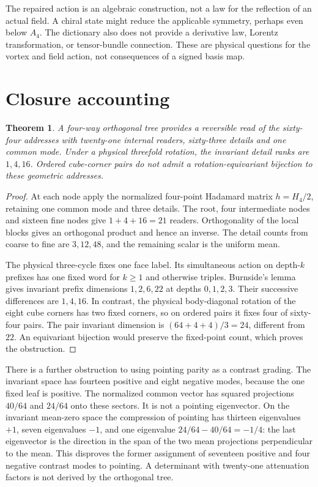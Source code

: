 \documentclass[10pt,a4paper,twocolumn]{article}
\newtheorem{theorem}{Theorem}
\begin{document}
The repaired action is an algebraic construction, not a law for the reflection of an actual field. A chiral state might reduce the applicable symmetry, perhaps even below $A_4$. The dictionary also does not provide a derivative law, Lorentz transformation, or tensor-bundle connection. These are physical questions for the vortex and field action, not consequences of a signed basis map.

\section*{Closure accounting}
\begin{theorem}
A four-way orthogonal tree provides a reversible read of the sixty-four addresses with twenty-one internal readers, sixty-three details and one common mode. Under a physical threefold rotation, the invariant detail ranks are $1,4,16$. Ordered cube-corner pairs do not admit a rotation-equivariant bijection to these geometric addresses.
\end{theorem}
\begin{proof}
At each node apply the normalized four-point Hadamard matrix $h=H_4/2$, retaining one common mode and three details. The root, four intermediate nodes and sixteen fine nodes give $1+4+16=21$ readers. Orthogonality of the local blocks gives an orthogonal product and hence an inverse. The detail counts from coarse to fine are $3,12,48$, and the remaining scalar is the uniform mean.

The physical three-cycle fixes one face label. Its simultaneous action on depth-$k$ prefixes has one fixed word for $k\ge1$ and otherwise triples. Burnside's lemma gives invariant prefix dimensions $1,2,6,22$ at depths $0,1,2,3$. Their successive differences are $1,4,16$. In contrast, the physical body-diagonal rotation of the eight cube corners has two fixed corners, so on ordered pairs it fixes four of sixty-four pairs. The pair invariant dimension is $(64+4+4)/3=24$, different from $22$. An equivariant bijection would preserve the fixed-point count, which proves the obstruction.
\end{proof}
There is a further obstruction to using pointing parity as a contrast grading. The invariant space has fourteen positive and eight negative modes, because the one fixed leaf is positive. The normalized common vector has squared projections $40/64$ and $24/64$ onto these sectors. It is not a pointing eigenvector. On the invariant mean-zero space the compression of pointing has thirteen eigenvalues $+1$, seven eigenvalues $-1$, and one eigenvalue $24/64-40/64=-1/4$: the last eigenvector is the direction in the span of the two mean projections perpendicular to the mean. This disproves the former assignment of seventeen positive and four negative contrast modes to pointing. A determinant with twenty-one attenuation factors is not derived by the orthogonal tree.
\end{document}
